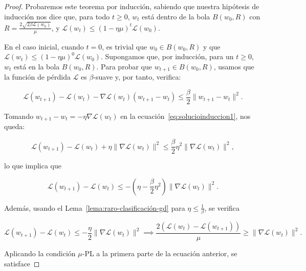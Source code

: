 \begin{proof}
    Probaremos este teorema por inducción, sabiendo que nuestra hipótesis de inducción nos dice que, para todo $t \geq 0$, $w_t$ está dentro de la bola $B(w_0, R)$ con $R = \frac{2\sqrt{2\beta \mathcal{L}(w_0)}}{\mu}$, y $\mathcal{L}(w_t) \leq (1 - \eta \mu)^{t} \mathcal{L}(w_0)$.

    En el caso inicial, cuando $t = 0$, es trivial que $w_0 \in B(w_0, R)$ y que $\mathcal{L}(w_t) \leq (1 - \eta \mu)^{0} \mathcal{L}(w_0)$. Supongamos que, por inducción, para un $t \geq 0$, $w_t$ está en la bola $B(w_0, R)$. Para probar que $w_{t+1} \in B(w_0, R)$, usamos que la función de pérdida $\mathcal{L}$ es $\beta$-suave y, por tanto, verifica:

    \begin{equation}\label{eq:solucioinduccion1}
        \mathcal{L}(w_{t+1}) - \mathcal{L}(w_{t}) - \nabla \mathcal{L}(w_{t}) (w_{t+1} - w_{t}) \leq \frac{\beta}{2} \| w_{t+1} - w_{t} \|^2.
    \end{equation}

    Tomando $w_{t+1} - w_{t} = -\eta \nabla \mathcal{L}(w_{t})$ en la ecuación~\eqref{eq:solucioinduccion1}, nos queda:  

    \begin{equation}\label{eq:solucioinduccion2}
        \mathcal{L}(w_{t+1}) - \mathcal{L}(w_{t}) + \eta \| \nabla \mathcal{L}(w_{t}) \|^2 \leq \frac{\beta}{2} \eta^2 \| \nabla \mathcal{L}(w_{t}) \|^2,
    \end{equation}

    lo que implica que

    \begin{equation}\label{eq:solucioinduccion3}
        \mathcal{L}(w_{t+1}) - \mathcal{L}(w_{t}) \leq - \left( \eta - \frac{\beta}{2}\eta^2 \right) \| \nabla \mathcal{L}(w_{t}) \|^2.
    \end{equation}

    Además, usando el Lema~\ref{lema:raro-clasificación-gd} para $\eta \leq \frac{1}{\beta}$, se verifica

    \begin{equation}\label{eq:solucioinduccion4}
        \mathcal{L}(w_{t+1}) - \mathcal{L}(w_{t}) \leq - \frac{\eta}{2} \| \nabla \mathcal{L}(w_{t}) \|^2 \implies \frac{2(\mathcal{L}(w_{t}) - \mathcal{L}(w_{t+1}))}{\mu} \geq \| \nabla \mathcal{L}(w_{t}) \|^2.
    \end{equation}

    Aplicando la condición $\mu$-PL a la primera parte de la ecuación anterior, se satisface


\end{proof}
